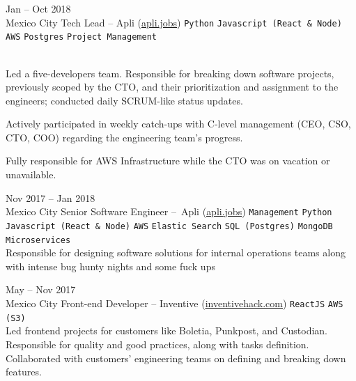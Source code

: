 \documentclass[9pt]{developercv} %
\begin{document}
\begin{entrylist}
    \entry
        {
            Jan -- Oct 2018
            \\\footnotesize{Mexico City}
        }
        {Tech Lead – Apli ({\href{https://apli.jobs/}{\underline{apli.jobs}}})}
        {
            \texttt{Python}
            \slashsep\texttt{Javascript (React \& Node)}
            \slashsep\texttt{AWS}
            \slashsep\texttt{Postgres}
            \slashsep\texttt{Project Management}
        }
        {\\

            Led a five-developers team. Responsible for breaking down software projects, previously scoped by the CTO, and their prioritization and assignment to the engineers; conducted daily SCRUM-like status updates. 

            Actively participated in weekly catch-ups with C-level management (CEO, CSO, CTO, COO) regarding the engineering team's progress.

            Fully responsible for AWS Infrastructure while the CTO was on vacation or unavailable.

            
        }

    \entry
        {
            Nov 2017 -- Jan 2018
            \\\footnotesize{Mexico City}
        }
        {Senior Software Engineer – Apli ({\href{https://apli.jobs/}{\underline{apli.jobs}}})}
        {
            \texttt{Management}
            \slashsep\texttt{Python}
            \slashsep\texttt{Javascript (React \& Node)}
            \slashsep\texttt{AWS}
            \slashsep\texttt{Elastic Search}
            \slashsep\texttt{SQL (Postgres)}
            \slashsep\texttt{MongoDB}
            \slashsep\texttt{Microservices}
        }
        {\\
            Responsible for designing software solutions for internal operations teams along with intense bug hunty nights and some fuck ups
        }

    \entry
        {
            May -- Nov 2017
            \\\footnotesize{Mexico City}
        }
        {Front-end Developer – Inventive ({\href{https://www.linkedin.com/company/inventivehack/}{\underline{inventivehack.com}}})}
        { 
            \texttt{ReactJS}
            \slashsep\texttt{AWS (S3)}
        }
        {\\
            Led frontend projects for customers like Boletia, Punkpost, and Custodian. Responsible for quality and good practices, along with tasks definition. Collaborated with customers' engineering teams on defining and breaking down features.\\
            
}
\end{entrylist}
\end{document}

